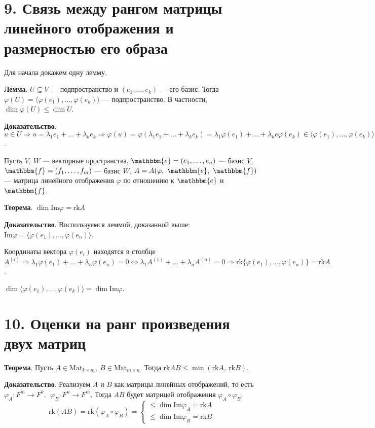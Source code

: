 \documentclass[a4paper, 12pt]{article}
\newcommand{\me}{\mathbbm{e}}
\newcommand{\mf}{\mathbbm{f}}
\newcommand{\Mat}{\text{Mat}}
\newcommand{\rk}{\text{rk}}
\renewcommand{\Im}{\text{Im}}
\begin{document}
\section*{9. Связь между рангом матрицы линейного отображения и размерностью его образа}
Для начала докажем одну лемму.

\textbf{Лемма}. $U \subseteq V$ --- подпространство и $(e_1, \ldots, e_k)$ --- его базис. Тогда $\varphi(U) = \langle \varphi(e_1), \ldots, \varphi(e_k) \rangle$ --- подпространство. В частности, $\dim\varphi(U) \leqslant \dim U$.

\textbf{Доказательство}. $u \in U \Longrightarrow u = \lambda_1e_1 + \ldots + \lambda_ke_k \Longrightarrow \varphi(u) = \varphi(\lambda_1e_1 + \ldots + \lambda_ke_k) = \lambda_1\varphi(e_1) + \ldots + \lambda_ke\varphi(e_k) \in \langle \varphi(e_1), \ldots, \varphi(e_k) \rangle$.

\vspace{5mm}
Пусть $V,\ W$ --- векторные пространства, $\me = (e_1, \ldots, e_n)$ --- базис $V$, $\mf = (f_1, \ldots, f_m)$ --- базис $W$, $A = A(\varphi,\ \me,\ \mf)$ --- матрица линейного отображения $\varphi$ по отношению к $\me$ и $\mf$.

\textbf{Теорема}. $\dim\Im\varphi = \rk A$

\textbf{Доказательство}. Воспользуемся леммой, доказанной выше: $\Im\varphi = \langle \varphi(e_1), \ldots, \varphi(e_n) \rangle$.

Координаты вектора $\varphi(e_i)$ находятся в столбце $A^{(i)} \Longrightarrow \lambda_1\varphi(e_1) + \ldots + \lambda_n\varphi(e_n) = 0 \Longleftrightarrow \lambda_1 A^{(1)} + \ldots + \lambda_n A^{(n)} = 0 \Longrightarrow \rk\{\varphi(e_1), \ldots, \varphi(e_n)\} = \rk A$.

$\dim\langle \varphi(e_1), \ldots, \varphi(e_k) \rangle = \dim \Im\varphi$.

\section*{10. Оценки на ранг произведения двух матриц}
\textbf{Теорема}. Пусть $A \in \Mat_{k \times m},\ B \in \Mat_{m \times n}$. Тогда $\rk AB \leqslant \min(\rk A,\ \rk B)$.

\textbf{Доказательство}. Реализуем $A$ и $B$ как матрицы линейных отображений, то есть $\varphi_A: F^m \rightarrow F^k,\ \ \varphi_B:F^n \rightarrow F^m$. Тогда $AB$ будет матрицей отображения $\varphi_A \circ \varphi_B$.
\vspace{-3mm}
\[
\rk(AB) = \rk(\varphi_A \circ \varphi_B) =
\begin{cases*}
\leqslant\dim\Im\varphi_A = \rk A \\
\leqslant\dim\Im\varphi_B = \rk B
\end{cases*}
\]
\end{document}
